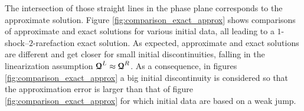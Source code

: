The intersection of those straight lines in the phase plane corresponds to the approximate solution. Figure \ref{fig:comparison_exact_approx} shows comparisons of approximate and exact solutions for various initial data, all leading to a $1$-shock--$2$-rarefaction exact solution. As expected, approximate and exact solutions are different and get closer for small initial discontinuities, falling in the linearization assumption ${\boldsymbol{\mathcal{Q}}}^L\approx {\boldsymbol{\mathcal{Q}}}^R$. As a consequence, in figures \ref{fig:comparison_exact_approx} a big initial discontinuity is considered so that the approximation error is larger than that of figure \ref{fig:comparison_exact_approx} for which initial data are based on a weak jump.



